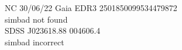 NC 30/06/22
Gaia EDR3 2501850099534479872\\
simbad not found \\

SDSS J023618.88 004606.4\\
simbad incorrect\\